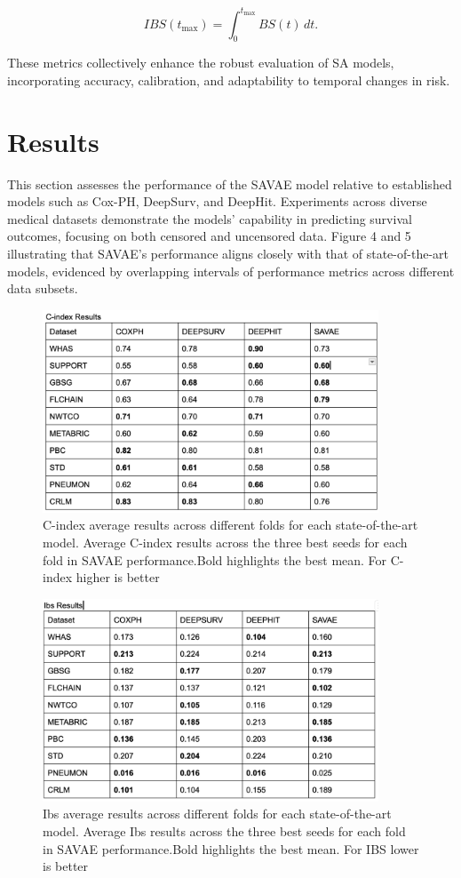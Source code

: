 \documentclass{article}
\begin{document}
\begin{equation}
IBS(t_{\text{max}}) = \int_0^{t_{\text{max}}} BS(t) \, dt.
\end{equation}

These metrics collectively enhance the robust evaluation of SA models, incorporating accuracy, calibration, and adaptability to temporal changes in risk.

\section{Results}
This section assesses the performance of the SAVAE model relative to established models such as Cox-PH, DeepSurv, and DeepHit. Experiments across diverse medical datasets demonstrate the models' capability in predicting survival outcomes, focusing on both censored and uncensored data. Figure 4 and 5 illustrating that SAVAE's performance aligns closely with that of state-of-the-art models, evidenced by overlapping intervals of performance metrics across different data subsets.

\begin{figure}[H]
    \centering
    \includegraphics[width=10cm]{figures/c-indices.png}
    \caption{C-index average results across different folds for each state-of-the-art model. Average C-index results across the three best seeds for each fold in SAVAE performance.Bold highlights the best mean. For C-index higher is better }
    \label{c-index}

\end{figure}

\begin{figure}[H]
    \centering
    \includegraphics[width=10cm]{figures/ibs.png}
    \caption{Ibs average results across different folds for each state-of-the-art model. Average Ibs results across the three best seeds for each fold in SAVAE performance.Bold highlights the best mean. For IBS lower is better  }
    \label{ibs}

\end{figure}
\end{document}
